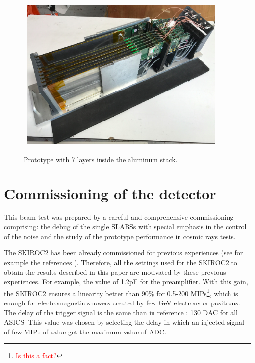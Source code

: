 \documentclass[a4paper,11pt]{article}
\newcommand{\todo}[1]{\textcolor{red}{{#1}}}
\begin{document}
\begin{figure}[!t]
\centering
\begin{tabular}{l}
\includegraphics[width=4.0in]{figs/proto.png} 
\end{tabular}
\caption{Prototype with 7 layers inside the aluminum stack.}
\label{proto}
\end{figure}


\section{Commissioning of the detector}
\label{sec:commissioning}

This beam test was prepared by a careful and comprehensive commissioning comprising:
the debug of the
single SLABSs with special emphasis in the control of the noise and the study of the
prototype performance in cosmic rays tests.

The SKIROC2 has been already commissioned for previous experiences (see for example the 
references \cite{Amjad:2014tha,Suehara:2018mqk}). 
Therefore, all the settings used for the SKIROC2 to obtain 
the results described in this paper are motivated by these previous experiences. 
For example, the value of 1.2pF for the preamplifier. 
With this gain, the SKIROC2 ensures a linearity better than 90\% 
for 0.5-200 MIPs\footnote{\todo{Is this a fact?}}, which is enough for 
electromagnetic showers created by few GeV 
electrons or positrons. The delay of the trigger signal is the same than in 
reference \cite{Amjad:2014tha,Suehara:2018mqk}: 130 DAC for all ASICS. 
This value was chosen by selecting the delay in which an injected signal
of few MIPs of value get the maximum value of ADC. %
\end{document}
